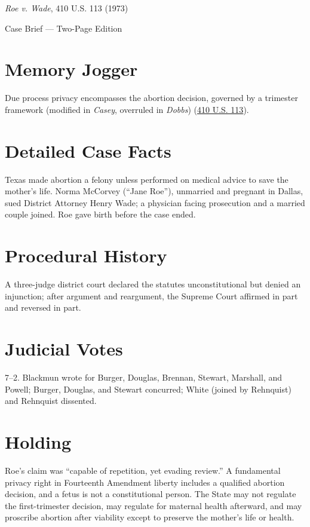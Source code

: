 \documentclass[12pt]{article}
\begin{document}
\begin{center}
{\LARGE \textit{Roe v. Wade}, 410 U.S. 113 (1973)\par}
\vspace{0.5em}
{\large Case Brief --- Two-Page Edition\par}
\end{center}

\section{Memory Jogger}
Due process privacy encompasses the abortion decision, governed by a trimester framework (modified in \textit{Casey}, overruled in \textit{Dobbs}) (\href{https://supreme.justia.com/cases/federal/us/410/113/}{410 U.S. 113}).

\section{Detailed Case Facts}
Texas made abortion a felony unless performed on medical advice to save the mother's life. Norma McCorvey (``Jane Roe''), unmarried and pregnant in Dallas, sued District Attorney Henry Wade; a physician facing prosecution and a married couple joined. Roe gave birth before the case ended.

\section{Procedural History}
A three-judge district court declared the statutes unconstitutional but denied an injunction; after argument and reargument, the Supreme Court affirmed in part and reversed in part.

\section{Judicial Votes}
7--2. Blackmun wrote for Burger, Douglas, Brennan, Stewart, Marshall, and Powell; Burger, Douglas, and Stewart concurred; White (joined by Rehnquist) and Rehnquist dissented.

\section{Holding}
Roe's claim was ``capable of repetition, yet evading review.'' A fundamental privacy right in Fourteenth Amendment liberty includes a qualified abortion decision, and a fetus is not a constitutional person. The State may not regulate the first-trimester decision, may regulate for maternal health afterward, and may proscribe abortion after viability except to preserve the mother's life or health.
\end{document}
